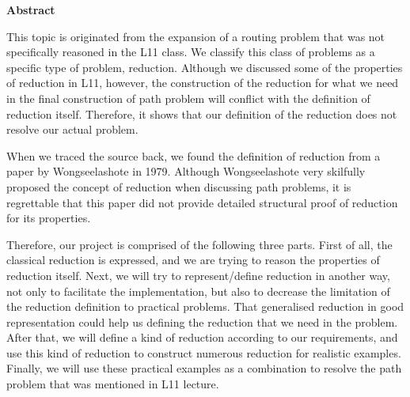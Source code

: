 \newpage
{\Huge \bf Abstract}
\vspace{24pt} 

This topic is originated from the expansion of a routing problem that was not specifically reasoned in the L11 class. We classify this class of problems as a specific type of problem, reduction. Although we discussed some of the properties of reduction in L11, however, the construction of the reduction for what we need in the final construction of path problem will conflict with the definition of reduction itself. Therefore, it shows that our definition of the reduction does not resolve our actual problem.

When we traced the source back, we found the definition of reduction from a paper by Wongseelashote in 1979. Although Wongseelashote very skilfully proposed the concept of reduction when discussing path problems, it is regrettable that this paper did not provide detailed structural proof of reduction for its properties.

Therefore, our project is comprised of the following three parts. First of all, the classical reduction is expressed, and we are trying to reason the properties of reduction itself. Next, we will try to represent/define reduction in another way, not only to facilitate the implementation, but also to decrease the limitation of the reduction definition to practical problems. That generalised reduction in good representation could help us defining the reduction that we need in the problem. After that, we will define a kind of reduction according to our requirements, and use this kind of reduction to construct numerous reduction for realistic examples. Finally, we will use these practical examples as a combination to resolve the path problem that was mentioned in L11 lecture.

\newpage
\vspace*{\fill}
